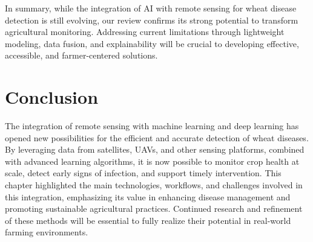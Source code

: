 In summary, while the integration of AI with remote sensing for wheat disease detection is still evolving, our review confirms its strong potential to transform agricultural monitoring. Addressing current limitations through lightweight modeling, data fusion, and explainability will be crucial to developing effective, accessible, and farmer-centered solutions.


\section{Conclusion}
The integration of remote sensing with machine learning and deep learning has opened new possibilities for the efficient and accurate detection of wheat diseases. By leveraging data from satellites, UAVs, and other sensing platforms, combined with advanced learning algorithms, it is now possible to monitor crop health at scale, detect early signs of infection, and support timely intervention. This chapter highlighted the main technologies, workflows, and challenges involved in this integration, emphasizing its value in enhancing disease management and promoting sustainable agricultural practices. Continued research and refinement of these methods will be essential to fully realize their potential in real-world farming environments.